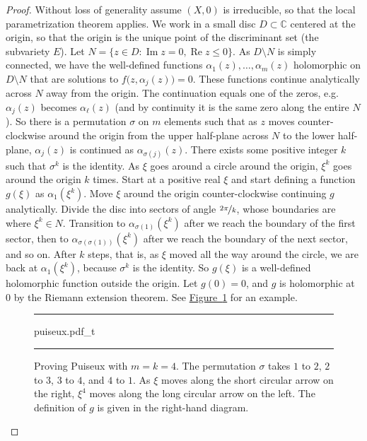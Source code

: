 \documentclass[12pt,openany]{book}
\renewcommand{\Re}{\operatorname{Re}}
\renewcommand{\Im}{\operatorname{Im}}
\newcommand{\C}{{\mathbb{C}}}
\theoremstyle{plain}
\theoremstyle{remark}
\theoremstyle{definition}
\newenvironment{myfig}{%
\begin{figure}[h!t]
\noindent\rule{\textwidth}{0.5pt}\vspace{12pt}\par\centering}%
{\par\noindent\rule{\textwidth}{0.5pt}
\end{figure}}
\theoremstyle{exercise}
\theoremstyle{example}
\newcommand{\figureref}[1]{\hyperref[#1]{Figure~\ref*{#1}}}
\begin{document}
\begin{proof}
Without loss of generality
assume $(X,0)$
is irreducible, so that
the local parametrization theorem applies.
We work in a small disc $D \subset \C$ centered at the origin, so that the
origin is the unique point of the discriminant set (the subvariety
$E$).  Let $N = \{ z \in D : \Im z = 0 , \Re z \leq 0 \}$.
As $D \setminus N$ is simply connected, we have the well-defined functions
$\alpha_1(z),\ldots,\alpha_m(z)$ holomorphic on $D \setminus N$
that are solutions to $f\bigl(z,\alpha_j(z)\bigr) = 0$.
These functions continue analytically across $N$ away from the
origin.  The continuation equals one of the zeros, e.g.\ $\alpha_j(z)$
becomes $\alpha_\ell(z)$ (and by continuity it is the
same zero along the entire $N$).  So there is
a permutation $\sigma$ on $m$ elements such that as $z$ moves
counter-clockwise around the origin from the upper half-plane across $N$ to the
lower half-plane,
$\alpha_j(z)$ is continued as $\alpha_{\sigma(j)}(z)$.
There exists some positive integer $k$ such that $\sigma^k$ is the identity.
As $\xi$ goes around
a circle around the origin, $\xi^k$ goes around the origin $k$ times.
Start at a positive real $\xi$ and start defining a
function $g(\xi)$ as
$\alpha_1(\xi^k)$.
Move $\xi$ around the origin counter-clockwise continuing $g$ analytically.
Divide the disc into sectors of angle $\nicefrac{2\pi}{k}$,
whose boundaries are where $\xi^k \in N$.
Transition to $\alpha_{\sigma(1)}(\xi^k)$ after we reach the boundary
of the first sector, then to
$\alpha_{\sigma(\sigma(1))}(\xi^k)$ after we reach the boundary of the next sector, and so on.
After $k$ steps, that is, as
$\xi$ moved all the way around the circle,
we are back at $\alpha_1(\xi^k)$,
because
$\sigma^k$ is the identity.
So $g(\xi)$ is a well-defined holomorphic function outside the origin.  Let
$g(0) = 0$, and $g$ is holomorphic at $0$ by the Riemann extension theorem.
See \figureref{fig:puiseux} for an example.
\begin{myfig}
{puiseux.pdf_t}
\caption{Proving Puiseux with $m = k = 4$.  The permutation $\sigma$ takes
$1$ to $2$, $2$ to $3$, $3$ to $4$,
and $4$ to $1$.  As $\xi$ moves along the short circular arrow on the right, $\xi^4$
moves along the long circular arrow on the left.  The definition of $g$ is
given in the right-hand diagram.\label{fig:puiseux}}
\end{myfig}
\end{proof}
\end{document}
